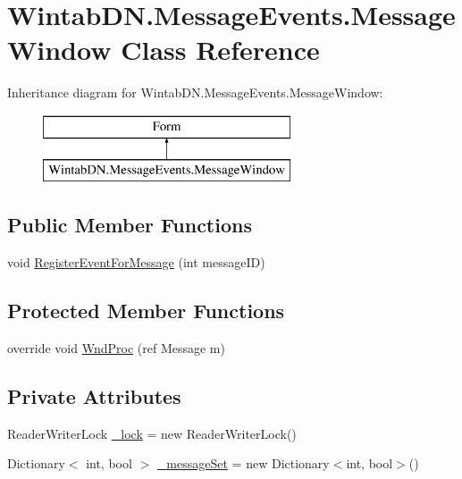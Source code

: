 \hypertarget{class_wintab_d_n_1_1_message_events_1_1_message_window}{}\section{Wintab\+D\+N.\+Message\+Events.\+Message\+Window Class Reference}
\label{class_wintab_d_n_1_1_message_events_1_1_message_window}
Inheritance diagram for Wintab\+D\+N.\+Message\+Events.\+Message\+Window\+:\begin{figure}[H]
\begin{center}
\leavevmode
\includegraphics[height=2.000000cm]{class_wintab_d_n_1_1_message_events_1_1_message_window}
\end{center}
\end{figure}
\subsection*{Public Member Functions}
\begin{DoxyCompactItemize}
\item 
void \mbox{\hyperlink{class_wintab_d_n_1_1_message_events_1_1_message_window_af9200b16c60b75173285fa3294a02fc1}{Register\+Event\+For\+Message}} (int message\+ID)
\end{DoxyCompactItemize}
\subsection*{Protected Member Functions}
\begin{DoxyCompactItemize}
\item 
override void \mbox{\hyperlink{class_wintab_d_n_1_1_message_events_1_1_message_window_a3bd18cf029efc75766b99965e11ee62c}{Wnd\+Proc}} (ref Message m)
\end{DoxyCompactItemize}
\subsection*{Private Attributes}
\begin{DoxyCompactItemize}
\item 
Reader\+Writer\+Lock \mbox{\hyperlink{class_wintab_d_n_1_1_message_events_1_1_message_window_a7c319d57cbec3e47c834608ccda4faf6}{\+\_\+lock}} = new Reader\+Writer\+Lock()
\item 
Dictionary$<$ int, bool $>$ \mbox{\hyperlink{class_wintab_d_n_1_1_message_events_1_1_message_window_a8d2becae9e1048174dcefa03fc007019}{\+\_\+message\+Set}} = new Dictionary$<$int, bool$>$()
\end{DoxyCompactItemize}


